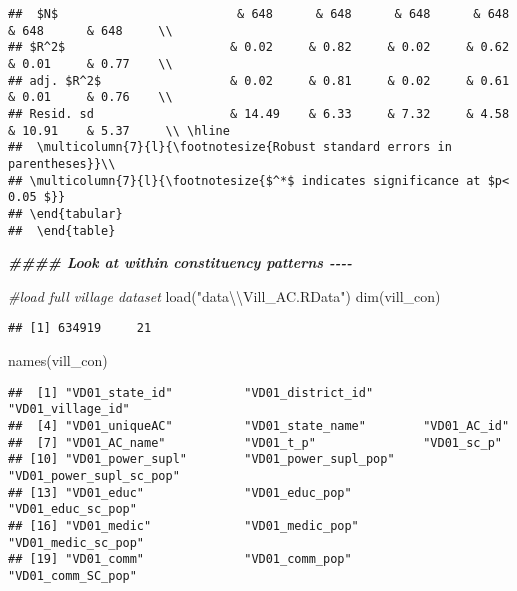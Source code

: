 \documentclass[
]{article}
\newenvironment{Shaded}{\begin{snugshade}}{\end{snugshade}}
\newcommand{\CommentTok}[1]{\textcolor[rgb]{0.56,0.35,0.01}{\textit{#1}}}
\newcommand{\DocumentationTok}[1]{\textcolor[rgb]{0.56,0.35,0.01}{\textbf{\textit{#1}}}}
\newcommand{\FunctionTok}[1]{\textcolor[rgb]{0.00,0.00,0.00}{#1}}
\newcommand{\NormalTok}[1]{#1}
\newcommand{\SpecialCharTok}[1]{\textcolor[rgb]{0.00,0.00,0.00}{#1}}
\newcommand{\StringTok}[1]{\textcolor[rgb]{0.31,0.60,0.02}{#1}}
\begin{document}
\begin{verbatim}
##  $N$                         & 648      & 648      & 648      & 648      & 648      & 648     \\ 
## $R^2$                       & 0.02     & 0.82     & 0.02     & 0.62     & 0.01     & 0.77    \\ 
## adj. $R^2$                  & 0.02     & 0.81     & 0.02     & 0.61     & 0.01     & 0.76    \\ 
## Resid. sd                   & 14.49    & 6.33     & 7.32     & 4.58     & 10.91    & 5.37     \\ \hline
##  \multicolumn{7}{l}{\footnotesize{Robust standard errors in parentheses}}\\
## \multicolumn{7}{l}{\footnotesize{$^*$ indicates significance at $p< 0.05 $}} 
## \end{tabular} 
##  \end{table}
\end{verbatim}

\begin{Shaded}
\begin{Highlighting}[]
\DocumentationTok{\#\#\#\# Look at within constituency patterns {-}{-}{-}{-}}

\CommentTok{\#load full village dataset}
\FunctionTok{load}\NormalTok{(}\StringTok{"data}\SpecialCharTok{\textbackslash{}\textbackslash{}}\StringTok{Vill\_AC.RData"}\NormalTok{)}
\FunctionTok{dim}\NormalTok{(vill\_con) }
\end{Highlighting}
\end{Shaded}

\begin{verbatim}
## [1] 634919     21
\end{verbatim}

\begin{Shaded}
\begin{Highlighting}[]
\FunctionTok{names}\NormalTok{(vill\_con)}
\end{Highlighting}
\end{Shaded}

\begin{verbatim}
##  [1] "VD01_state_id"          "VD01_district_id"       "VD01_village_id"       
##  [4] "VD01_uniqueAC"          "VD01_state_name"        "VD01_AC_id"            
##  [7] "VD01_AC_name"           "VD01_t_p"               "VD01_sc_p"             
## [10] "VD01_power_supl"        "VD01_power_supl_pop"    "VD01_power_supl_sc_pop"
## [13] "VD01_educ"              "VD01_educ_pop"          "VD01_educ_sc_pop"      
## [16] "VD01_medic"             "VD01_medic_pop"         "VD01_medic_sc_pop"     
## [19] "VD01_comm"              "VD01_comm_pop"          "VD01_comm_SC_pop"
\end{verbatim}
\end{document}
